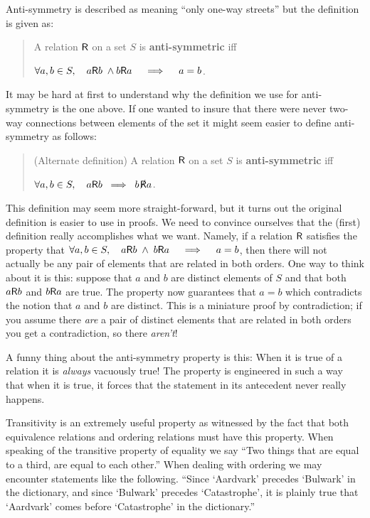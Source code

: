 \begin{center}

\end{center}

Anti-symmetry is described as meaning ``only one-way streets'' but the definition is given
as:

\begin{quote}
A relation $\mbox{\textsf R}$ on a set $S$ is {\bf anti-symmetric} iff \newline
\centerline{ $\displaystyle \forall a,b \in S, \quad a \mbox{\textsf R} b \; \land b \mbox{\textsf R} a \quad \implies \quad a=b$.}
\end{quote}

It may be hard at first to understand why the definition we use for anti-symmetry is the one above.
If one wanted to insure that there were never two-way connections between elements of the set it
might seem easier to define anti-symmetry as follows:

\begin{quote}
(Alternate definition) A relation $\mbox{\textsf R}$ on a set $S$ is {\bf anti-symmetric} iff \newline
\centerline{ $\displaystyle \forall a,b \in S, \quad a \relR b \; \implies \; b \nrelR a$.}
\end{quote}

This definition may seem more straight-forward, but it turns out the original definition is
easier to use in proofs.  We need to convince ourselves that the (first) definition really
accomplishes what we want.  Namely, if a relation $\mbox{\textsf R}$ satisfies the property that
$\displaystyle \forall a,b \in S, \quad a \mbox{\textsf R} b \; \land \; b \mbox{\textsf R} a \quad \implies \quad a=b$,
then there will not actually be any pair of elements that are related in both orders.  One
way to think about it is this: suppose that $a$ and $b$ are distinct elements of $S$ and
that both $a \mbox{\textsf R} b$ and $b \mbox{\textsf R} a$ are true.  The property now guarantees that $a=b$
which contradicts the notion that $a$ and $b$ are distinct.  This is a miniature proof
by contradiction; if you assume there \emph{are} a pair of distinct elements that are
related in both orders you get a contradiction, so there \emph{aren't}!

A funny thing about the anti-symmetry property is this:  When it is true of a relation it 
is \emph{always} vacuously true!  The property is engineered in such a way that when it is
true, it forces that the statement in its antecedent never really happens.

Transitivity is an extremely useful property as witnessed by the fact that both equivalence
relations and ordering relations must have this property.  When speaking of the transitive
property of equality we say ``Two things that are equal to a third, are equal to each other.''
When dealing with ordering we may encounter statements like the following.  
``Since `Aardvark' precedes `Bulwark'  %
in the dictionary, and since `Bulwark' precedes `Catastrophe', it is plainly true that `Aardvark'  %
comes before `Catastrophe' in the dictionary.''

